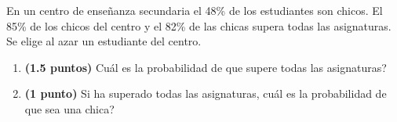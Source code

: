 
En un centro de enseñanza secundaria el 48\% de los estudiantes son chicos. El 85\% de los chicos del centro y el 82\% de las chicas supera todas las asignaturas. Se elige al azar un estudiante del centro.
\begin{enumerate}[label=\alph*)]
\item \textbf{(1.5 puntos)} \textquestiondown{}Cuál es la probabilidad de que supere todas las asignaturas?
\item \textbf{(1 punto)} Si ha superado todas las asignaturas, \textquestiondown{}cuál es la probabilidad de que sea una chica?
\end{enumerate}
